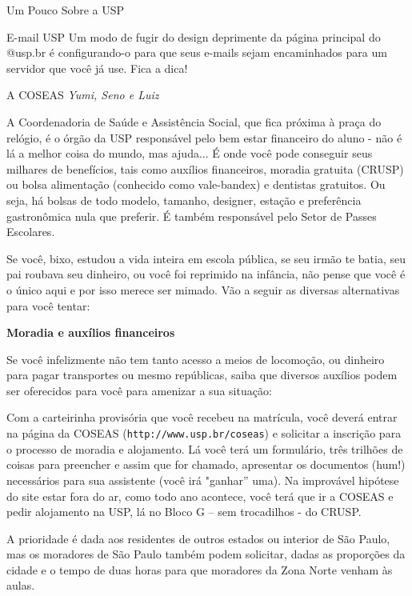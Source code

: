 \begin{secao}{Um Pouco Sobre a USP}
\begin{subsecao}{E-mail USP}
Um modo de fugir do design deprimente da página principal do @usp.br é configurando-o para que seus e-mails sejam encaminhados para um servidor que você já use. Fica a dica! 



\end{subsecao}



\begin{subsecao}{A COSEAS}
{\em Yumi, Seno e Luiz}

A Coordenadoria de Saúde e Assistência Social, que fica próxima à praça do relógio, é o órgão da USP responsável pelo bem estar financeiro do aluno - não é lá a melhor coisa do mundo, mas ajuda... É onde você pode conseguir seus milhares de benefícios, tais como auxílios financeiros, moradia gratuita (CRUSP) ou bolsa alimentação (conhecido como vale-bandex) e dentistas gratuitos. Ou seja, há bolsas de todo modelo, tamanho, designer, estação e preferência gastronômica nula que preferir. É também responsável pelo Setor de Passes Escolares. 

Se você, bixo, estudou a vida inteira em escola pública, se seu irmão te batia, seu pai roubava seu dinheiro, ou você foi reprimido na infância, não pense que você é o único aqui e por isso merece ser mimado. Vão a seguir as diversas alternativas para você tentar:


{\bf Moradia e auxílios financeiros}


Se você infelizmente não tem tanto acesso a meios de locomoção, ou dinheiro para pagar transportes ou mesmo repúblicas, saiba que diversos auxílios podem ser oferecidos para você para amenizar a sua situação:

Com a carteirinha provisória que você recebeu na matrícula, você deverá entrar na página da COSEAS ({\tt http://www.usp.br/coseas}) e solicitar a inscrição para o processo de moradia e alojamento. Lá você terá um formulário, três trilhões de coisas para preencher e assim que for chamado, apresentar os documentos (hum!) necessários para sua assistente (você irá "ganhar” uma). Na improvável hipótese do site estar fora do ar, como todo ano acontece, você terá que ir a COSEAS e pedir alojamento na USP, lá no Bloco G – sem trocadilhos - do CRUSP.

A prioridade é dada aos residentes de outros estados ou interior de São Paulo, mas os moradores de São Paulo também podem solicitar, dadas as proporções da cidade e o tempo de duas horas para que moradores da Zona Norte venham às aulas. 


\end{subsecao}
\end{secao}
